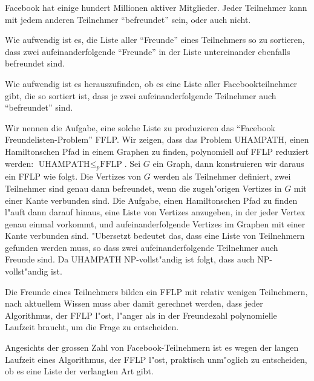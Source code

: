 Facebook hat einige hundert Millionen aktiver Mitglieder.
Jeder Teilnehmer kann mit jedem anderen Teilnehmer ``befreundet''
sein, oder auch nicht.
\begin{teilaufgaben}
\item
Wie aufwendig ist es, die Liste aller ``Freunde''
eines Teilnehmers so zu sortieren, dass zwei aufeinanderfolgende ``Freunde''
in der Liste untereinander ebenfalls befreundet sind.
\item
Wie aufwendig
ist es herauszufinden, ob es eine Liste aller Facebookteilnehmer gibt,
die so sortiert ist, dass je zwei aufeinanderfolgende Teilnehmer
auch ``befreundet'' sind.
\end{teilaufgaben}

\begin{loesung}
Wir nennen die Aufgabe, eine solche Liste zu produzieren das ``Facebook
Freundelisten-Problem'' FFLP. Wir zeigen, dass das Problem
UHAMPATH, einen Hamiltonschen Pfad in einem Graphen zu finden,
polynomiell auf FFLP reduziert werden:
$\text{UHAMPATH}\le_p\text{FFLP}$.
Sei $G$ ein Graph, dann konstruieren wir daraus ein FFLP wie
folgt. Die Vertizes von $G$ werden als Teilnehmer definiert,
zwei Teilnehmer sind genau dann befreundet, wenn die zugeh"origen
Vertizes in $G$ mit einer Kante verbunden sind. Die Aufgabe, einen
Hamiltonschen Pfad zu finden l"auft dann darauf hinaus, eine Liste
von Vertizes anzugeben, in der jeder Vertex genau einmal vorkommt,
und aufeinanderfolgende Vertizes im Graphen mit einer Kante verbunden
sind. "Ubersetzt bedeutet das, dass eine Liste von Teilnehmern gefunden
werden muss, so dass zwei aufeinanderfolgende Teilnehmer auch Freunde sind.
Da UHAMPATH NP-vollst"andig ist folgt, dass auch  NP-vollst"andig
ist.
\begin{teilaufgaben}
\item Die Freunde eines Teilnehmers bilden ein FFLP mit relativ wenigen
Teilnehmern, nach aktuellem Wissen muss aber damit gerechnet werden,
dass jeder Algorithmus, der FFLP l"ost, l"anger als in der Freundezahl
polynomielle Laufzeit braucht, um die Frage zu entscheiden.
\item Angesichts der grossen Zahl von Facebook-Teilnehmern ist es
wegen der langen Laufzeit eines Algorithmus, der FFLP l"ost,
praktisch unm"oglich zu entscheiden, ob es eine Liste der verlangten
Art gibt.
\qedhere
\end{teilaufgaben}
\end{loesung}
